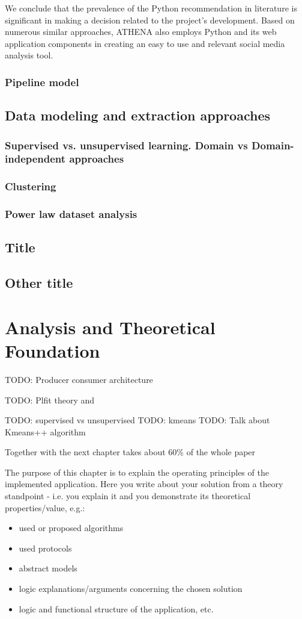 \documentclass[12pt,a4paper,twoside]{report}
\begin{document}
We conclude that the prevalence of the Python recommendation in literature is significant in making a decision related to the project's development. Based on numerous similar approaches, ATHENA also employs Python and its web application components in creating an easy to use and relevant social media analysis tool.

\subsection{Pipeline model}

\section{Data modeling and extraction approaches}
\subsection{Supervised vs. unsupervised learning. Domain vs Domain-independent approaches}
\subsection{Clustering}
\subsection{Power law dataset analysis}

\section{Title}
\section{Other title}


\chapter{Analysis and Theoretical Foundation}
\label{ch:analysis}
TODO: Producer consumer architecture

\label{plfittheory}
TODO: Plfit theory and \cite{clauset2009power}

TODO: supervised vs unsupervised
TODO: kmeans
\label{kmeansplusplus}
TODO: Talk about Kmeans++ algorithm


Together with the next chapter takes about 60\% of the whole paper

The purpose of this chapter is to explain the operating principles of the implemented application.
Here you write about your solution from a theory standpoint - i.e. you explain it and you demonstrate its theoretical properties/value, e.g.:
\begin{itemize}
 \item used or proposed algorithms
 \item used protocols
 \item abstract models
 \item logic explanations/arguments concerning the chosen solution
 \item logic and functional structure of the application, etc.
\end{itemize}
\end{document}
